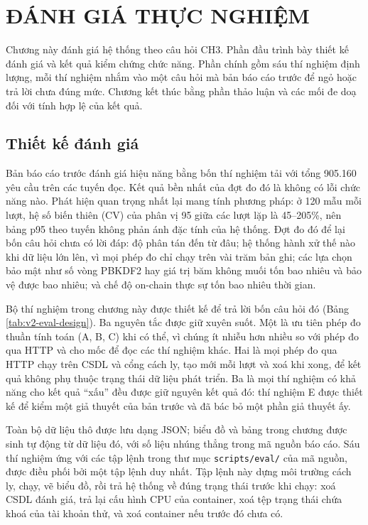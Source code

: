 \chapter{ĐÁNH GIÁ THỰC NGHIỆM}
\label{chap:danh-gia}

Chương này đánh giá hệ thống theo câu hỏi CH3. Phần đầu trình bày thiết kế đánh giá và kết quả kiểm chứng chức năng. Phần chính gồm sáu thí nghiệm định lượng, mỗi thí nghiệm nhắm vào một câu hỏi mà bản báo cáo trước để ngỏ hoặc trả lời chưa đúng mức. Chương kết thúc bằng phần thảo luận và các mối đe doạ đối với tính hợp lệ của kết quả.

\section{Thiết kế đánh giá}
\label{sec:thiet-ke-dg}

Bản báo cáo trước đánh giá hiệu năng bằng bốn thí nghiệm tải với tổng 905.160 yêu cầu trên các tuyến đọc. Kết quả bền nhất của đợt đo đó là không có lỗi chức năng nào. Phát hiện quan trọng nhất lại mang tính phương pháp: ở 120 mẫu mỗi lượt, hệ số biến thiên (CV) của phân vị 95 giữa các lượt lặp là 45--205\%, nên bảng p95 theo tuyến không phản ánh đặc tính của hệ thống. Đợt đo đó để lại bốn câu hỏi chưa có lời đáp: độ phân tán đến từ đâu; hệ thống hành xử thế nào khi dữ liệu lớn lên, vì mọi phép đo chỉ chạy trên vài trăm bản ghi; các lựa chọn bảo mật như số vòng PBKDF2 hay giá trị băm không muối tốn bao nhiêu và bảo vệ được bao nhiêu; và chế độ on-chain thực sự tốn bao nhiêu thời gian.

Bộ thí nghiệm trong chương này được thiết kế để trả lời bốn câu hỏi đó (Bảng \ref{tab:v2-eval-design}). Ba nguyên tắc được giữ xuyên suốt. Một là ưu tiên phép đo thuần tính toán (A, B, C) khi có thể, vì chúng ít nhiễu hơn nhiều so với phép đo qua HTTP và cho mốc để đọc các thí nghiệm khác. Hai là mọi phép đo qua HTTP chạy trên CSDL và cổng cách ly, tạo mới mỗi lượt và xoá khi xong, để kết quả không phụ thuộc trạng thái dữ liệu phát triển. Ba là mọi thí nghiệm có khả năng cho kết quả ``xấu'' đều được giữ nguyên kết quả đó: thí nghiệm E được thiết kế để kiểm một giả thuyết của bản trước và đã bác bỏ một phần giả thuyết ấy.





Toàn bộ dữ liệu thô được lưu dạng JSON; biểu đồ và bảng trong chương được sinh tự động từ dữ liệu đó, với số liệu nhúng thẳng trong mã nguồn báo cáo. Sáu thí nghiệm ứng với các tập lệnh trong thư mục \texttt{scripts/eval/} của mã nguồn, được điều phối bởi một tập lệnh duy nhất. Tập lệnh này dựng môi trường cách ly, chạy, vẽ biểu đồ, rồi trả hệ thống về đúng trạng thái trước khi chạy: xoá CSDL đánh giá, trả lại cấu hình CPU của container, xoá tệp trạng thái chứa khoá của tài khoản thử, và xoá container nếu trước đó chưa có.

